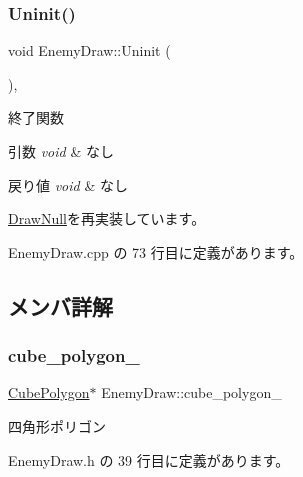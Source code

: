 \subsubsection{\texorpdfstring{Uninit()}{Uninit()}}
{\footnotesize\ttfamily void Enemy\+Draw\+::\+Uninit (\begin{DoxyParamCaption}{ }\end{DoxyParamCaption})\hspace{0.3cm}{\ttfamily [override]}, {\ttfamily [virtual]}}



終了関数 


\begin{DoxyParams}{引数}
{\em void} & なし \\
\hline
\end{DoxyParams}

\begin{DoxyRetVals}{戻り値}
{\em void} & なし \\
\hline
\end{DoxyRetVals}


\mbox{\hyperlink{class_draw_null_a6e81d63efab7333e8d0e8af99362a4d9}{Draw\+Null}}を再実装しています。



 Enemy\+Draw.\+cpp の 73 行目に定義があります。



\subsection{メンバ詳解}
\mbox{\label{class_enemy_draw_a4f35f850ee5e41bb43fc6979e83589dd}} 
\subsubsection{\texorpdfstring{cube\+\_\+polygon\+\_\+}{cube\_polygon\_}}
{\footnotesize\ttfamily \mbox{\hyperlink{class_cube_polygon}{Cube\+Polygon}}$\ast$ Enemy\+Draw\+::cube\+\_\+polygon\+\_\+\hspace{0.3cm}{\ttfamily [private]}}



四角形ポリゴン 



 Enemy\+Draw.\+h の 39 行目に定義があります。

\mbox{\label{class_enemy_draw_a95b8a7f07e810d1347f1704669c8f790}} 
